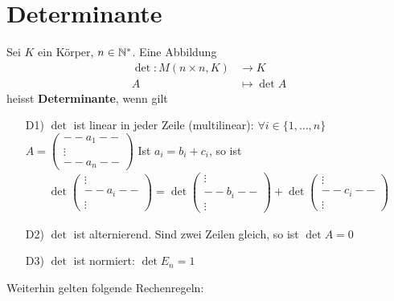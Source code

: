 \newpage
\section{Determinante}
\begin{mdframed}
Sei $K$ ein Körper, $n \in \mathbb{N}^*$. Eine Abbildung
\begin{align*}
    \det: M(n\times n,K) &\rightarrow K\\
    A &\mapsto \det A
\end{align*}
heisst \textbf{Determinante}, wenn gilt
\begin{itemize}
    \item[D1)] $\det$ ist linear in jeder Zeile (multilinear): $\forall i \in \{1,\ldots, n\}$
    $A = \begin{pmatrix}
        --a_1--\\
        \vdots\\
        --a_n--
    \end{pmatrix}$
    Ist $a_i = b_i + c_i$, so ist
    \begin{align*}
        \det \begin{pmatrix}
            \vdots\\
            --a_i--\\
            \vdots
        \end{pmatrix}
        = \det \begin{pmatrix}
            \vdots\\
            --b_i--\\
            \vdots
        \end{pmatrix}
        + \det \begin{pmatrix}
            \vdots\\
            --c_i--\\
            \vdots
        \end{pmatrix}
    \end{align*}
    
    \item[D2)] $\det$ ist alternierend. Sind zwei Zeilen gleich, so ist $\det A = 0$
    
    \item[D3)] $\det$ ist normiert: $\det E_n = 1$
\end{itemize}
\end{mdframed}
Weiterhin gelten folgende Rechenregeln:
